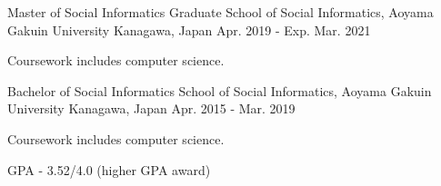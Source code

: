 

\begin{cventries}

  \cventry
    {Master of Social Informatics} %
    {Graduate School of Social Informatics, Aoyama Gakuin University} %
    {Kanagawa, Japan} %
    {Apr. 2019 - Exp. Mar. 2021} %
    {
      \begin{cvitems} %
        \item {Coursework includes computer science.}
      \end{cvitems}
    }

  \cventry
    {Bachelor of Social Informatics} %
    {School of Social Informatics, Aoyama Gakuin University} %
    {Kanagawa, Japan} %
    {Apr. 2015 - Mar. 2019} %
    {
      \begin{cvitems} %
      \item {Coursework includes computer science.}
      \item {GPA - 3.52/4.0 (higher GPA award)}
      \end{cvitems}
    }

\end{cventries}
